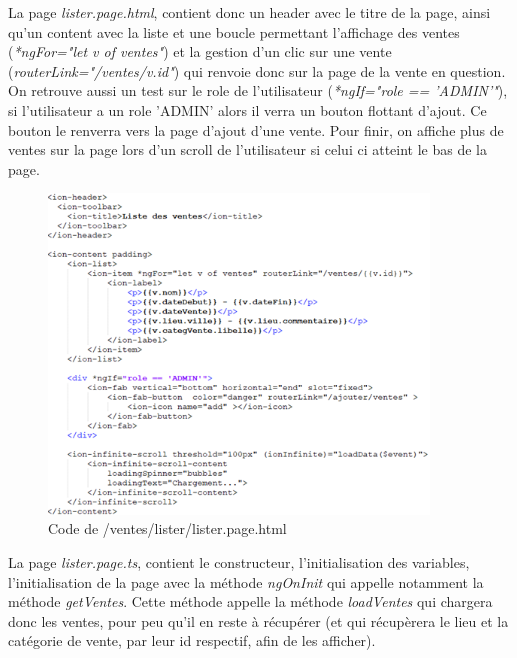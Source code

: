 					La page \textit{lister.page.html}, contient donc un header avec le titre de la page, ainsi qu'un content avec la liste et une boucle permettant l'affichage des ventes (\textit{*ngFor="let v of ventes"}) et la gestion d'un clic sur une vente (\textit{routerLink="/ventes/{{v.id}}"}) qui renvoie donc sur la page de la vente en question. \newline
					On retrouve aussi un test sur le role de l'utilisateur (\textit{*ngIf="role == 'ADMIN'"}), si l'utilisateur a un role 'ADMIN' alors il verra un bouton flottant d'ajout. Ce bouton le renverra vers la page d'ajout d'une vente. \newline
					Pour finir, on affiche plus de ventes sur la page lors d'un scroll de l'utilisateur si celui ci atteint le bas de la page.

					\begin{figure}[H]
						\centering\includegraphics[width=0.9\textwidth, keepaspectratio]{res/lister.png}
						\caption{Code de /ventes/lister/lister.page.html}
					\end{figure}

					La page \textit{lister.page.ts}, contient le constructeur, l'initialisation des variables, l'initialisation de la page avec la méthode \textit{ngOnInit} qui appelle notamment la méthode \textit{getVentes}. Cette méthode appelle la méthode \textit{loadVentes} qui chargera donc les ventes, pour peu qu'il en reste à récupérer (et qui récupèrera le lieu et la catégorie de vente, par leur id respectif, afin de les afficher).

